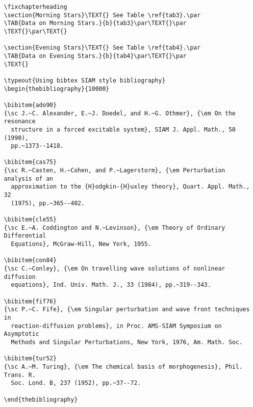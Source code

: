 \begin{verbatim}
\fixchapterheading
\section{Morning Stars}\TEXT{} See Table \ref{tab3}.\par
\TAB{Data on Morning Stars.}{b}{tab3}\par\TEXT{}\par
\TEXT{}\par\TEXT{}

\section{Evening Stars}\TEXT{} See Table \ref{tab4}.\par
\TAB{Data on Evening Stars.}{b}{tab4}\par\TEXT{}\par
\TEXT{}

\typeout{Using bibtex SIAM style bibliography}
\begin{thebibliography}{10000}

\bibitem{ado90}
{\sc J.~C. Alexander, E.~J. Doedel, and H.~G. Othmer}, {\em On the resonance
  structure in a forced excitable system}, SIAM J. Appl. Math., 50 (1990),
  pp.~1373--1418.

\bibitem{cas75}
{\sc R.~Casten, H.~Cohen, and P.~Lagerstorm}, {\em Perturbation analysis of an
  approximation to the {H}odgkin-{H}uxley theory}, Quart. Appl. Math., 32
  (1975), pp.~365--402.

\bibitem{cle55}
{\sc E.~A. Coddington and N.~Levinson}, {\em Theory of Ordinary Differential
  Equations}, McGraw-Hill, New York, 1955.

\bibitem{con84}
{\sc C.~Conley}, {\em On travelling wave solutions of nonlinear diffusion
  equations}, Ind. Univ. Math. J., 33 (1984), pp.~319--343.

\bibitem{fif76}
{\sc P.~C. Fife}, {\em Singular perturbation and wave front techniques in
  reaction-diffusion problems}, in Proc. AMS-SIAM Symposium on Asymptotic
  Methods and Singular Perturbations, New York, 1976, Am. Math. Soc.

\bibitem{tur52}
{\sc A.~M. Turing}, {\em The chemical basis of morphogenesis}, Phil. Trans. R.
  Soc. Lond. B, 237 (1952), pp.~37--72.

\end{thebibliography}



\end{verbatim}


